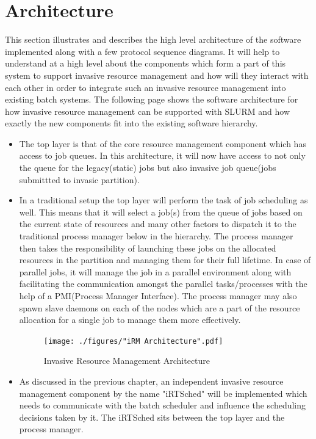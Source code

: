 \chapter{Architecture}
\label{chapter:dynamic resource}
This section illustrates and describes the high level architecture of the software implemented along with a few protocol sequence diagrams. It will help to understand at a high level about the components which form a part of this system to support invasive resource management and how will they interact with each other in order to integrate such an invasive resource management into existing batch systems. The following page shows the software architecture for how invasive resource management can be supported with SLURM and how exactly the new components fit into the existing software hierarchy.
\begin{itemize}
\item The top layer is that of the core resource management component which has access to job queues. In this architecture, it will now have access to not only the queue for the legacy(static) jobs but also invasive job queue(jobs submittted to invasic partition).
\item In a traditional setup the top layer will perform the task of job scheduling as well. This means that it will select a job(s) from the queue of jobs based on the current state of resources and many other factors to dispatch it to the traditional process manager below in the hierarchy. The process manager then takes the responsibility of launching these jobs on the allocated resources in the partition and managing them for their full lifetime. In case of parallel jobs, it will manage the job in a parallel environment along with facilitating the communication amongst the parallel tasks/processes with the help of a PMI(Process Manager Interface). The process manager may also spawn slave daemons on each of the nodes which are a part of the resource allocation for a single job to manage them more effectively.
\begin{figure}[!htbp]
\centering
\texttt{[image: ./figures/"iRM Architecture".pdf]}
\caption{Invasive Resource Management Architecture}
\label{fig:7}
\end{figure}
\item As discussed in the previous chapter, an independent invasive resource management component by the name "iRTSched" will be implemented which needs to communicate with the batch scheduler and influence the scheduling decisions taken by it. The iRTSched sits between the top layer and the process manager.

\end{itemize}
